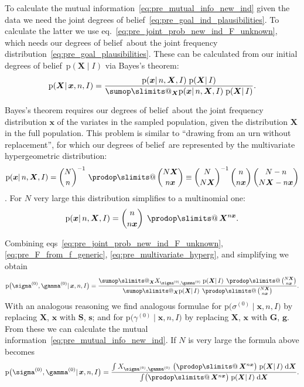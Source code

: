\documentclass[\ifafour a4paper,12pt,\else a5paper,10pt,\fi%
onecolumn,oneside,article,%
british%
]{memoir}
\makeatletter
\theoremstyle{remark}
\theoremstyle{innote}
\def\sum{\DOTSI\sumop\slimits@}
\def\prod{\DOTSI\prodop\slimits@}
\newcommand*{\citep}{\parencites}
\newcommand*{\di}{\mathrm{d}}%
\newcommand*{\pf}{\mathrm{p}}%
\renewcommand*{\|}{\mathpunct{|}}
\newcommand*{\sect}{\S}%
\newcommand*{\chap}{ch.}%
\newcommand*{\eqn}{eq.}%
\newcommand*{\eqns}{eqs}%
\newcommand*{\tprod}{\mathop{\textstyle\prod}\nolimits}
\newcommand*{\dobs}{degrees of belief}
\newcommand*{\yI}{I}
\newcommand*{\yprod}{\tprod}
\newcommand*{\ys}{\sigma}
\newcommand*{\yg}{\gamma}
\newcommand*{\ysi}[1]{\ys^{(#1)}}
\newcommand*{\ygi}[1]{\yg^{(#1)}}
\newcommand*{\yso}{\ysi{0}}
\newcommand*{\ygo}{\ygi{0}}
\newcommand*{\yFs}{\bm{S}}
\newcommand*{\yfs}{\bm{s}}
\newcommand*{\yFg}{\bm{G}}
\newcommand*{\yfg}{\bm{g}}
\newcommand*{\yF}{\bm{X}}
\newcommand*{\yf}{\bm{x}}
\makeatother
\begin{document}
\medskip

To calculate the mutual information~\eqref{eq:pre_mutual_info_new_ind} given
the data we need the joint \dobs~\eqref{eq:pre_goal_ind_plausibilities}. To
calculate the latter we use \eqn~\eqref{eq:pre_joint_prob_new_ind_F_unknown},
which needs our \dobs\ about the joint frequency
distribution~\eqref{eq:pre_goal_plausibilities}. These can be calculated from
our initial \dobs\ $\pf( \yF \| \yI)$ via Bayes's theorem:
\begin{equation}
  \label{eq:pre_F_from_f_generic}
  \pf(\yF \| \yf, n, \yI) =
  \frac{\pf(\yf \| n,\yF, \yI)\; \pf(\yF \| \yI)}{
  \sum_{\yF}\pf(\yf \| n,\yF, \yI)\; \pf(\yF \| \yI)}.
\end{equation}

Bayes's theorem requires our \dobs\ about the joint frequency distribution
$\yf$ of the variates in the sampled population, given the distribution
$\yF$ in the full population. This problem is similar to \enquote{drawing
  from an urn without replacement}, for which our \dobs\ are represented by
the multivariate hypergeometric distribution:
\begin{equation}
  \label{eq:pre_multivariate_hyperg}
  \pf(\yf \| n,\yF, \yI) =
  \binom{N}{n}^{-1}\,\yprod\binom{N\yF}{n\yf}
  \equiv \binom{N}{N\yF}^{-1}\,\binom{n}{n\yf}\,\binom{N-n}{N\yF-n\yf}
\end{equation}
\citep{ghoshetal1997}[parts~I, VI]{freedmanetal1978_r2007}[summaries
in][\chap~8]{gelmanetal1995_r2014}[\chap~3]{jaynes1994_r2003}[properties of
this distribution are discussed
in][\sect~4.8.3]{ross1976_r2010}[\sect~II.6]{feller1950_r1968}. For $N$
very large this distribution simplifies to a multinomial one:
\begin{equation}
  \label{eq:pre_multivariate_hyperg_Ninf}
  \pf(\yf \| n,\yF, \yI) =\binom{n}{n\yf} \;\yprod \yF^{n\yf}.
\end{equation}

Combining \eqns~\eqref{eq:pre_joint_prob_new_ind_F_unknown},
\eqref{eq:pre_F_from_f_generic}, \eqref{eq:pre_multivariate_hyperg}, and
simplifying we obtain
\begin{equation}
  \label{eq:pre_joint_prob_new_ind_full}
  \pf\bigl(\yso, \ygo \| \yf, n,\yI\bigr)  =
  \frac{
    \sum_{\yF} X_{\yso, \ygo}\;
    \pf(\yF \| \yI)\;\yprod\binom{N\yF}{n\yf}}{
  \sum_{\yF} \pf(\yF \| \yI)\;\yprod\binom{N\yF}{n\yf}}.
\end{equation}
With an analogous reasoning we find analogous formulae for
$\pf\bigl(\yso \| \yf, n,\yI\bigr)$ by replacing $\yF$, $\yf$ with
$\yFs$, $\yfs$; and for $\pf\bigl(\ygo \| \yf, n,\yI\bigr)$ by
replacing $\yF$, $\yf$ with $\yFg$, $\yfg$. From these we can calculate the
mutual information~\eqref{eq:pre_mutual_info_new_ind}.
If $N$ is very large the formula above becomes
\begin{equation}
  \label{eq:pre_joint_prob_new_ind_full_Ninf}
  \pf\bigl(\yso, \ygo \| \yf, n,\yI\bigr)  =
  \frac{
    \int X_{\yso, \ygo}\;\bigl( \yprod\yF^{n\yf} \bigr)\;
    \pf(\yF \| \yI)\;\di\yF}{
  \int\bigl( \yprod\yF^{n\yf} \bigr)\; \pf(\yF \| \yI)\;\di\yF}.
\end{equation}
\end{document}

